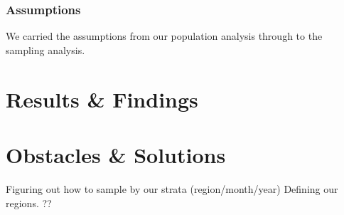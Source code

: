 \documentclass{article}
\begin{document}
\subsubsection{Assumptions}
We carried the assumptions from our population analysis through to the sampling analysis.


\section{Results \& Findings}






\section{Obstacles \& Solutions}
Figuring out how to sample by our strata (region/month/year)
Defining our regions.
??
\end{document}
